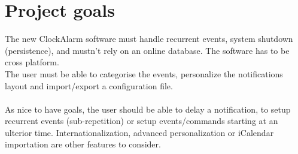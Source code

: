 \chapter{Project goals}

The new ClockAlarm software must handle recurrent events, system shutdown (persistence), and mustn't rely on an online database. The software has to be cross platform.\\
The user must be able to categorise the events, personalize the notifications layout and import/export a configuration file.\\
\\
As nice to have goals, the user should be able to delay a notification, to setup recurrent events (sub-repetition) or setup events/commands starting at an ulterior time. Internationalization, advanced personalization or iCalendar importation are other features to consider.